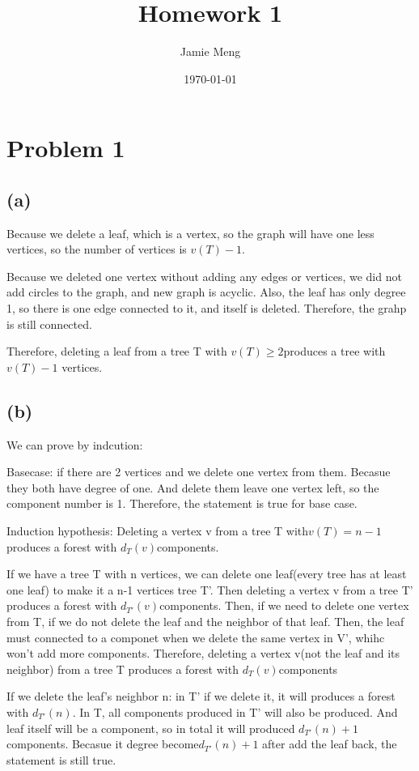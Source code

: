 \documentclass[11pt]{article}
\begin{document}
\title{Homework 1}
\author{Jamie Meng}
\date{\today}

\maketitle
\section{Problem 1}
\subsection*{(a)}
Because we delete a leaf, which is a vertex, so the graph will have one less vertices, so the number of vertices is $v(T)-1$.

Because we deleted one vertex without adding any edges or vertices, we did not add circles to the graph, and new graph is acyclic. Also, the leaf has only degree 1, so there is one edge connected to it, and itself is deleted. Therefore, the grahp is still connected.

Therefore, deleting a leaf from a tree T with $v(T ) \ge2 $produces a tree with $v(T ) - 1$ vertices.

\subsection*{(b)}
We can prove by indcution:

Basecase: if there are 2 vertices and we delete one vertex from them. Becasue they both have degree of one. And delete them leave one vertex left, so the component number is 1. Therefore, the statement is true for base case.

Induction hypothesis:
Deleting a vertex v from a tree T with$ v(T )=n-1$ produces a forest with $d_T (v) $components.

If we have a tree T with n vertices, we can delete one leaf(every tree has at least one leaf) to make it a n-1 vertices tree T'. Then deleting a vertex v from a tree T' produces a forest with $d_{T'} (v) $components. Then, if we need to delete one vertex from T, if we do not delete the leaf and the neighbor of that leaf. Then, the leaf must connected to a componet when we delete the same vertex in V', whihc won't add more components. Therefore, deleting a vertex v(not the leaf and its neighbor) from a tree T produces a forest with $d_T (v)$components

If we delete the leaf's neighbor n: in T' if we delete it, it will produces a forest with $d_{T'} (n)$. In T, all components produced in T' will also be produced. And leaf itself will be a component, so in total it will produced $d_{T'} (n)+1$components. Becasue it degree become$ d_{T'} (n)+1$ after add the leaf back, the statement is still true.
\end{document}
